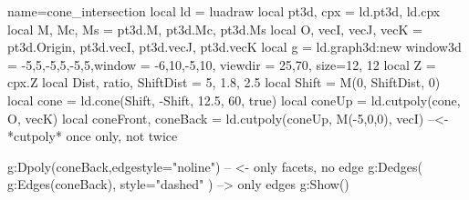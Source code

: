 \documentclass{standalone}
\begin{document}
\begin{luadraw}{name=cone_intersection}
local ld = luadraw
local pt3d, cpx = ld.pt3d, ld.cpx
local M, Mc, Ms = pt3d.M, pt3d.Mc, pt3d.Ms
local O, vecI, vecJ, vecK = pt3d.Origin, pt3d.vecI, pt3d.vecJ, pt3d.vecK
local g = ld.graph3d:new{
    window3d = {-5,5,-5,5,-5,5},window = {-6,10,-5,10},
    viewdir = {25,70}, size={12, 12}
}
local Z = cpx.Z
local Dist, ratio, ShiftDist = 5, 1.8, 2.5
local Shift = M(0, ShiftDist, 0)
local cone = ld.cone(Shift, -Shift, 12.5, 60, true)
local coneUp = ld.cutpoly(cone, {O, vecK}) 
local coneFront, coneBack = ld.cutpoly(coneUp, {M(-5,0,0), vecI}) --<- *cutpoly* once only, not twice

g:Dpoly(coneBack,{edgestyle="noline"}) -- <- only facets, no edge
g:Dedges( g:Edges(coneBack), {style="dashed"} ) --> only edges
g:Show()
\end{luadraw}
\end{document}
